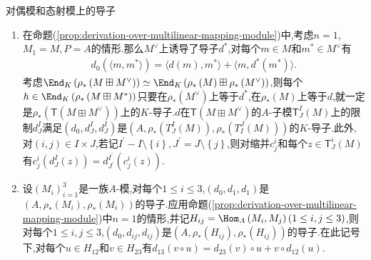 \begin{example}{对偶模和态射模上的导子}{}
	\begin{enumerate}
		\item 在命题(\ref{prop:derivation-over-multilinear-mapping-module})中,考虑$n=1$,$M_{1}=M,P=A$的情形.那么$M^{\vee}$上诱导了导子$d^{\ast}$,对每个$m\in M$和$m^{\ast}\in M^{\vee}$有
		\begin{align*}
			d_{0}\left(\langle m,m^{\ast}\rangle\right)=\langle d\left(m\right),m^{\ast}\rangle+\langle m,d^{\ast}\left(m^{\ast}\right)\rangle.
		\end{align*}
		考虑$\End_{K}\left(\rho_{\ast}\left(M\boxplus M^{\vee}\right)\right)\simeq\End_{K}\left(\rho_{\ast}\left(M\right)\boxplus\rho_{\ast}\left(M^{\vee}\right)\right)$,则每个$h\in\End_{K}\left(\rho_{\ast}\left(M\boxplus M^{\ast}\right)\right)$只要在$\rho_{\ast}\left(M^{\vee}\right)$上等于$d^{\ast}$,在$\rho_{\ast}\left(M\right)$上等于$d$,就一定是$\rho_{\ast}\left(\mathsf{T}\left(M\boxplus M^{\vee}\right)\right)$上的$K$-导子.$d$在$\mathsf{T}\left(M\boxplus M^{\vee}\right)$的$A$-子模$\mathsf{T}_{J}^{I}\left(M\right)$上的限制$d_{J}^{I}$满足$\left(d_{0},d_{J}^{I},d_{J}^{I}\right)$是$\left(A,\rho_{\ast}\left(T_{J}^{I}\left(M\right)\right),\rho_{\ast}\left(T_{I}^{J}\left(M\right)\right)\right)$的$K$-导子.此外,对$\left(i,j\right)\in I\times J$,若记$I^{\prime}-I\setminus\left\{i\right\},J^{\prime}=J\setminus\left\{j\right\}$,则对缩并$c_{j}^{i}$和每个$z\in\mathsf{T}_{J}^{i}\left(M\right)$有$c_{j}^{i}\left(d_{J}^{I}\left(z\right)\right)=d_{J^{\prime}}^{I^{\prime}}\left(c_{j}^{i}\left(z\right)\right)$.
		\item 设$\left(M_{i}\right)_{i=1}^{3}$是一族$A$-模,对每个$1\leq i\leq 3$,$\left(d_{0},d_{1},d_{1}\right)$是$\left(A,\rho_{\ast}\left(M_{i}\right),\rho_{\ast}\left(M_{i}\right)\right)$的导子.应用命题(\ref{prop:derivation-over-multilinear-mapping-module})中$n=1$的情形,并记$H_{ij}=\Hom_{A}\left(M_{i},M_{j}\right)\left(1\leq i,j\leq 3\right)$,则对每个$1\leq i,j\leq 3$,$\left(d_{0},d_{ij},d_{ij}\right)$是$\left(A,\rho_{\ast}\left(H_{ij}\right),\rho_{\ast}\left(H_{ij}\right)\right)$的导子.在此记号下,对每个$u\in H_{12}$和$v\in H_{23}$有$d_{13}\left(v\circ u\right)=d_{23}\left(v\right)\circ u+v\circ d_{12}\left(u\right)$.
	\end{enumerate}
\end{example}










